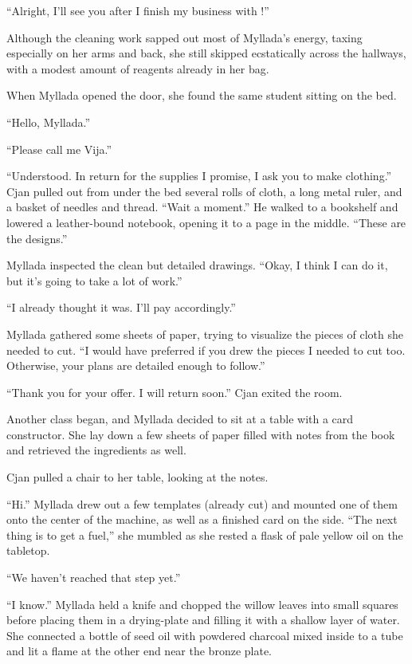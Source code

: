 ``Alright, I'll see you after I finish my business with \yronsyncra!''

\centeredstars

Although the cleaning work sapped out most of Myllada's energy, taxing especially on her arms and back, she still skipped ecstatically across the hallways, with a modest amount of reagents already in her bag.

When Myllada opened the door, she found the same student sitting on the bed.

``Hello, Myllada.''

``Please call me Vija.''

``Understood. In return for the supplies I promise, I ask you to make clothing.'' Cjan pulled out from under the bed several rolls of cloth, a long metal ruler, and a basket of needles and thread. ``Wait a moment.'' He walked to a bookshelf and lowered a leather-bound notebook, opening it to a page in the middle. ``These are the designs.''

Myllada inspected the clean but detailed drawings. ``Okay, I think I can do it, but it's going to take a lot of work.''

``I already thought it was. I'll pay accordingly.''

Myllada gathered some sheets of paper, trying to visualize the pieces of cloth she needed to cut. ``I would have preferred if you drew the pieces I needed to cut too. Otherwise, your plans are detailed enough to follow.''

``Thank you for your offer. I will return soon.'' Cjan exited the room.

\centeredstars

Another class began, and Myllada decided to sit at a table with a card constructor. She lay down a few sheets of paper filled with notes from the book and retrieved the ingredients as well.

Cjan pulled a chair to her table, looking at the notes.

``Hi.'' Myllada drew out a few templates (already cut) and mounted one of them onto the center of the machine, as well as a finished card on the side. ``The next thing is to get a fuel,'' she mumbled as she rested a flask of pale yellow oil on the tabletop.

``We haven't reached that step yet.''

``I know.'' Myllada held a knife and chopped the willow leaves into small squares before placing them in a drying-plate and filling it with a shallow layer of water. She connected a bottle of seed oil with powdered charcoal mixed inside to a tube and lit a flame at the other end near the bronze plate.

